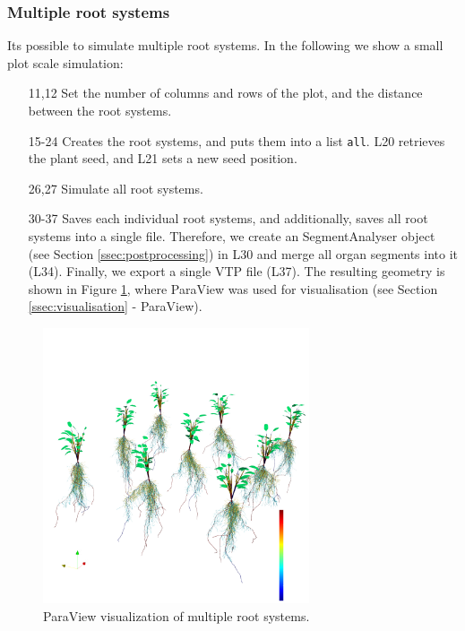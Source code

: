\subsubsection*{Multiple root systems}

Its possible to simulate multiple root systems. In the following we show a small plot scale simulation:



\begin{itemize}
\item[11,12] Set the number of columns and rows of the plot, and the distance between the root systems.
\item[15-24] Creates the root systems, and puts them into a list \texttt{all}. L20 retrieves the plant seed, and L21 sets a new seed position. 
\item[26,27] Simulate all root systems.
\item[30-37] Saves each individual root systems, and additionally, saves all root systems into a single file. 
Therefore, we create an SegmentAnalyser object (see Section \ref{ssec:postprocessing}) in L30 and merge all organ segments into it (L34). Finally, we export a single VTP file (L37). The resulting geometry is shown in Figure \ref{fig:topics_virtual4}, where ParaView was used for visualisation (see Section \ref{ssec:visualisation} - ParaView).
\end{itemize}

\begin{figure}
\centering
\includegraphics[width=0.7\textwidth]{figures/topics_virtual4.png}
\caption{ParaView visualization of multiple root systems.} \label{fig:topics_virtual4}
\end{figure}


